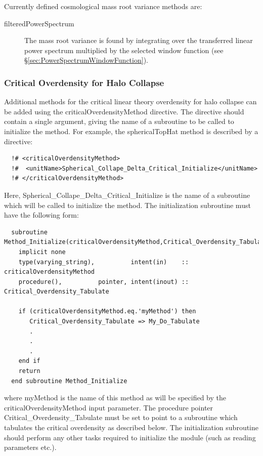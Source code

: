 Currently defined cosmological mass root variance methods are:
\begin{description}
 \item [{\normalfont \ttfamily filteredPowerSpectrum}] The mass root variance is found by integrating over the transferred linear power spectrum multiplied by the selected window function (see \S\ref{sec:PowerSpectrumWindowFunction}).
\end{description}

\subsubsection{Critical Overdensity for Halo Collapse}

Additional methods for the critical linear theory overdensity for halo collapse can be added using the {\normalfont \ttfamily criticalOverdensityMethod} directive. The directive should contain a single argument, giving the name of a subroutine to be called to initialize the method. For example, the {\normalfont \ttfamily sphericalTopHat} method is described by a directive:
\begin{verbatim}
  !# <criticalOverdensityMethod>
  !#  <unitName>Spherical_Collape_Delta_Critical_Initialize</unitName>
  !# </criticalOverdensityMethod>
\end{verbatim}
Here, {\normalfont \ttfamily Spherical\_Collape\_Delta\_Critical\_Initialize} is the name of a subroutine which will be called to initialize the method. The initialization subroutine must have the following form:
\begin{verbatim}
  subroutine Method_Initialize(criticalOverdensityMethod,Critical_Overdensity_Tabulate)
    implicit none
    type(varying_string),          intent(in)    :: criticalOverdensityMethod
    procedure(),          pointer, intent(inout) :: Critical_Overdensity_Tabulate
    
    if (criticalOverdensityMethod.eq.'myMethod') then
       Critical_Overdensity_Tabulate => My_Do_Tabulate
       .
       .
       .
    end if
    return
  end subroutine Method_Initialize
\end{verbatim}
where {\normalfont \ttfamily myMethod} is the name of this method as will be specified by the {\normalfont \ttfamily criticalOverdensityMethod} input parameter. The procedure pointer {\normalfont \ttfamily Critical\_Overdensity\_Tabulate} must be set to point to a subroutine which tabulates the critical overdensity as described below. The initialization subroutine should perform any other tasks required to initialize the module (such as reading parameters etc.).

